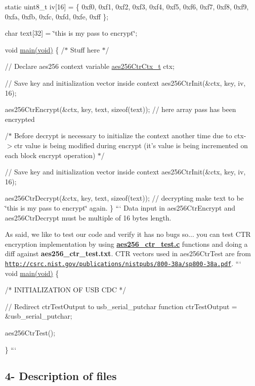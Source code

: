 static uint8\+\_\+t iv\mbox{[}16\mbox{]} = \{ 0xf0, 0xf1, 0xf2, 0xf3, 0xf4, 0xf5, 0xf6, 0xf7, 0xf8, 0xf9, 0xfa, 0xfb, 0xfc, 0xfd, 0xfe, 0xff \};

char text\mbox{[}32\mbox{]} = \char`\"{}this is my pass to encrypt\char`\"{};

void \hyperlink{mooltipass_8c_a568b3afc214ba30be5bf526d6b27b611}{main(void)} \{ /$\ast$ Stuff here $\ast$/

// Declare aes256 context variable \hyperlink{structaes256_ctr_ctx__t}{aes256\+Ctr\+Ctx\+\_\+t} ctx;

// Save key and initialization vector inside context aes256\+Ctr\+Init(\&ctx, key, iv, 16);

aes256\+Ctr\+Encrypt(\&ctx, key, text, sizeof(text)); // here array pass has been encrypted

/$\ast$ Before decrypt is necessary to initialize the context another time due to ctx-\/$>$ctr value is being modified during encrypt (it's value is being incremented on each block encrypt operation) $\ast$/

// Save key and initialization vector inside context aes256\+Ctr\+Init(\&ctx, key, iv, 16);

aes256\+Ctr\+Decrypt(\&ctx, key, text, sizeof(text)); // decrypting make text to be \char`\"{}this is my pass to encrypt\char`\"{} again. \} ``` Data input in aes256\+Ctr\+Encrypt and aes256\+Ctr\+Decrypt must be multiple of 16 bytes length.

As said, we like to test our code and verify it has no bugs so... you can test C\+T\+R encryption implementation by using {\bfseries \hyperlink{aes256__ctr__test_8c}{aes256\+\_\+ctr\+\_\+test.\+c}} functions and doing a diff against {\bfseries aes256\+\_\+ctr\+\_\+test.\+txt}. C\+T\+R vectors used in aes256\+Ctr\+Test are from \href{http://csrc.nist.gov/publications/nistpubs/800-38a/sp800-38a.pdf}{\tt http\+://csrc.\+nist.\+gov/publications/nistpubs/800-\/38a/sp800-\/38a.\+pdf}. ``` void \hyperlink{mooltipass_8c_a568b3afc214ba30be5bf526d6b27b611}{main(void)} \{ \begin{DoxyVerb}/*
    INITIALIZATION OF USB CDC
*/

// Redirect ctrTestOutput to usb_serial_putchar function
ctrTestOutput = &usb_serial_putchar;

aes256CtrTest();
\end{DoxyVerb}
 \} ```

\subsection*{4-\/ Description of files }


